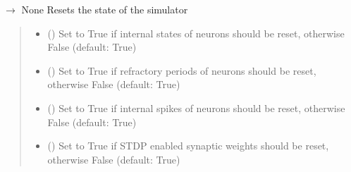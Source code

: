 \documentclass[letterpaper,10pt,english]{sphinxmanual}
\begin{document}
\begin{fulllineitems}
\begin{fulllineitems}
\end{fulllineitems}


\begin{fulllineitems}
\label{\detokenize{index:superneuromat.SNN.reset}}
\pysigstartsignatures
\pysiglinewithargsret
{}
{\sphinxparamcomma {}\sphinxparamcomma {}\sphinxparamcomma {}\sphinxparamcomma {}\sphinxparamcomma {}\sphinxparamcomma {}}
{{ $\rightarrow$ None}}
\pysigstopsignatures
\sphinxAtStartPar
Resets the state of the simulator
\begin{quote}\begin{description}
\begin{itemize}
\item {} 
\sphinxAtStartPar
{} () \textendash{} Set to True if internal states of neurons should be reset, otherwise False (default: True)

\item {} 
\sphinxAtStartPar
{} () \textendash{} Set to True if refractory periods of neurons should be reset, otherwise False (default: True)

\item {} 
\sphinxAtStartPar
{} () \textendash{} Set to True if internal spikes of neurons should be reset, otherwise False (default: True)

\item {} 
\sphinxAtStartPar
{} () \textendash{} Set to True if STDP enabled synaptic weights should be reset, otherwise False (default: True)


\end{itemize}
\end{description}
\end{quote}
\end{fulllineitems}
\end{fulllineitems}
\end{document}
